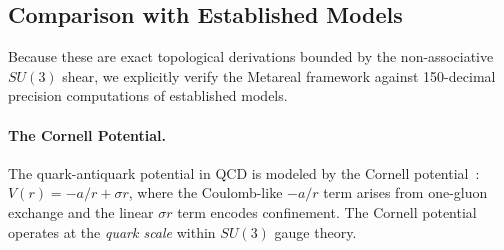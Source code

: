 \begin{table}[ht]
\centering
\renewcommand{\arraystretch}{1.3}
\caption{Cross-field embeddings of the optimal Bode lattice primes into the SU(3) Center triangle. Every Bode prime lands on a structurally significant position (primitive root or golden orbit) in at least two of the three gauge fields. The residue $499 \equiv 137 \pmod{181}$ is particularly striking: the inverse fine structure constant $\alpha^{-1} \approx 137$ emerges naturally on the $\bar\varphi$-orbit of the weak-force field.}
\label{tab:crossfield}
\end{table}

\subsection{Comparison with Established Models}
Because these are exact topological derivations bounded by the non-associative $SU(3)$ shear, we explicitly verify the Metareal framework against 150-decimal precision computations of established models.

\paragraph{The Cornell Potential.}
The quark-antiquark potential in QCD is modeled by the Cornell potential~\cite{eichten1980}: $V(r) = -a/r + \sigma r$, where the Coulomb-like $-a/r$ term arises from one-gluon exchange and the linear $\sigma r$ term encodes confinement. The Cornell potential operates at the \emph{quark scale} within $SU(3)$ gauge theory.

